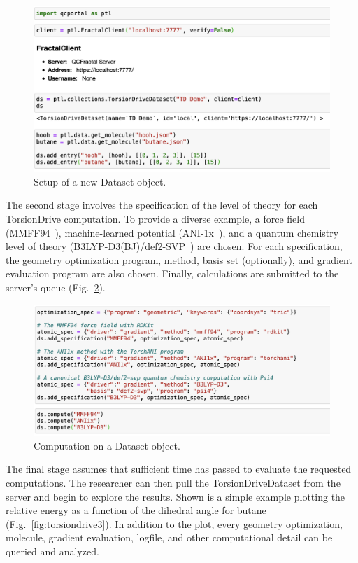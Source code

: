 \documentclass[journal=jctcce,manuscript=article]{achemso}
\newcommand{\qcfN}{QCFractal}
\newcommand{\qcf}{{\sc{\qcfN}}\xspace}%
\begin{document}
\begin{figure}[H]
    \centering
    \includegraphics[width=\columnwidth]{./images/Example1.png}
    \caption{Setup of a new Dataset object.}
    \label{fig:torsiondrive1}
\end{figure}

The second stage involves the specification of the level of theory for each
TorsionDrive computation.  To provide a diverse example, a force field
(MMFF94~\cite{halgren1996merck}), machine-learned potential
(ANI-1x~\cite{smith2018less}), and a quantum chemistry level of theory
(B3LYP-D3(BJ)/def2-SVP~\cite{Becke93,Lee88:LYP,weigend2005a})
are chosen.  For each specification, the geometry optimization program,
method, basis set (optionally), and gradient evaluation program are also
chosen. Finally, calculations are submitted to the \qcf server's queue
(Fig.~\ref{fig:torsiondrive2}).

\begin{figure}[H]
    \centering
    \includegraphics[width=\columnwidth]{./images/Example2.png}
    \caption{Computation on a Dataset object.}
    \label{fig:torsiondrive2}
\end{figure}

The final stage assumes that sufficient time has passed to evaluate the requested computations.
The researcher can then pull the TorsionDriveDataset from the server and begin to explore the results.
Shown is a simple example plotting the relative energy as a function of the dihedral angle for butane (Fig.~\ref{fig:torsiondrive3}).
In addition to the plot, every geometry optimization, molecule, gradient evaluation, logfile, and other computational detail can be queried and analyzed.
\end{document}
